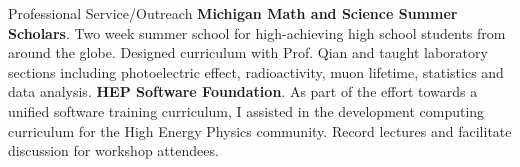 \begin{rubric}{Professional Service/Outreach}
\entry*[2023] \textbf{Michigan Math and Science Summer Scholars}.  Two week summer school for high-achieving high school students from around the globe.  Designed curriculum with Prof. Qian and taught laboratory sections including photoelectric effect, radioactivity, muon lifetime, statistics and data analysis.
%
\entry*[2020] \textbf{HEP Software Foundation}.  As part of the effort towards a unified software training curriculum, I assisted in the development computing curriculum for the High Energy Physics community.  Record lectures and facilitate discussion for workshop attendees.
\end{rubric}